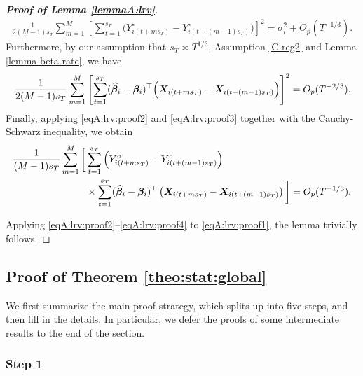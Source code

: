 \begin{proof}[\textnormal{\textbf{Proof of Lemma \ref{lemmaA:lrv}}}]
\begin{align}
\frac{1}{2(M-1)s_T}\sum_{m=1}^M \left[\sum_{t = 1}^{s_T} \Big(Y_{i(t + ms_T)}^\circ - Y_{i(t + (m-1)s_T)}^\circ\Big)\right]^2  = \sigma_i^2 + O_p(T^{-1/3}).
\end{align}
Furthermore, by our assumption that $s_T \asymp T^{1/3}$, Assumption \ref{C-reg2} and Lemma \ref{lemma-beta-rate}, we have
\begin{align}\label{eqA:lrv:proof3}
\frac{1}{2(M-1)s_T}\sum_{m=1}^M \left[\sum_{t = 1}^{s_T} (\widehat{\bm{\beta}}_i - \bm{\beta}_i)^\top\Big(\boldsymbol{X}_{i(t+ms_T)} - \boldsymbol{X}_{i(t+(m-1)s_T)}\Big) \right]^2 = O_p(T^{-2/3}).
\end{align}
Finally, applying \eqref{eqA:lrv:proof2} and \eqref{eqA:lrv:proof3} together with the Cauchy-Schwarz inequality, we obtain
\begin{align}\label{eqA:lrv:proof4}
\frac{1}{(M-1)s_T}\sum_{m=1}^M \bigg[ & \sum_{t = 1}^{s_T}  \left(Y_{i(t + ms_T)}^\circ - Y_{i(t + (m-1)s_T)}^\circ\right) \nonumber \\
& \times \sum_{t = 1}^{s_T} (\widehat{\bm{\beta}}_i - \bm{\beta}_i)^\top\left(\boldsymbol{X}_{i(t+ms_T)} - \boldsymbol{X}_{i(t+(m-1)s_T)}\right) \bigg] = O_p(T^{-1/3}).
\end{align}


Applying \eqref{eqA:lrv:proof2}--\eqref{eqA:lrv:proof4} to \eqref{eqA:lrv:proof1}, the lemma trivially follows.
\end{proof}



\subsection*{Proof of Theorem \ref{theo:stat:global}}\label{subsec-appendix-stat-equality}


We first summarize the main proof strategy, which splits up into five steps, and then fill in the details. In particular, we defer the proofs of some intermediate results to the end of the section. 


\subsubsection*{Step 1}



